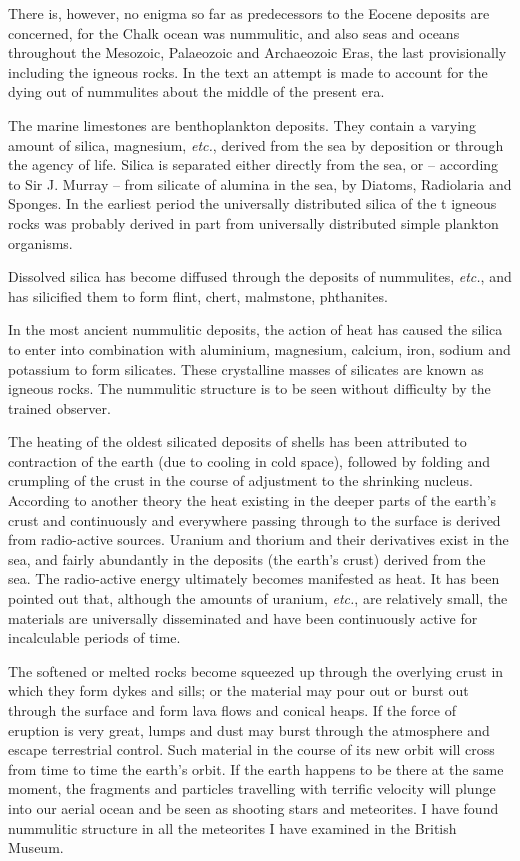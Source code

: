 \documentclass[a4paper, 12pt, oneside]{article}
\begin{document}
There is, however, no enigma so far as predecessors to the Eocene deposits are concerned, for the Chalk ocean was nummulitic, and also seas and oceans throughout the Mesozoic, Palaeozoic and Archaeozoic Eras, the last provisionally including the igneous rocks. In the text an attempt is made to account for the dying out of nummulites about the middle of the present era.

The marine limestones are benthoplankton deposits. They contain a varying amount of silica, magnesium, \emph{etc.}, derived from the sea by deposition or through the agency of life. Silica is separated either directly from the sea, or -- according to Sir J. Murray -- from silicate of alumina in the sea, by Diatoms, Radiolaria and Sponges. In the earliest period the universally distributed silica of the t igneous rocks was probably derived in part from universally distributed simple plankton organisms.

Dissolved silica has become diffused through the deposits of nummulites, \emph{etc.}, and has silicified them to form flint, chert, malmstone, phthanites.

In the most ancient nummulitic deposits, the action of heat has caused the silica to enter into combination with aluminium, magnesium, calcium, iron, sodium and potassium to form silicates. These crystalline masses of silicates are known as igneous rocks. The nummulitic structure is to be seen without difficulty by the trained observer.

The heating of the oldest silicated deposits of shells has been attributed to contraction of the earth (due to cooling in cold space), followed by folding and crumpling of the crust in the course of adjustment to the shrinking nucleus. According to another theory the heat existing in the deeper parts of the earth's crust and continuously and everywhere passing through to the surface is derived from radio-active sources. Uranium and thorium and their derivatives exist in the sea, and fairly abundantly in the deposits (the earth's crust) derived from the sea. The radio-active energy ultimately becomes manifested as heat. It has been pointed out that, although the amounts of uranium, \emph{etc.}, are relatively small, the materials are universally disseminated and have been continuously active for incalculable periods of time.

The softened or melted rocks become squeezed up through the overlying crust in which they form dykes and sills; or the material may pour out or burst out through the surface and form lava flows and conical heaps. If the force of eruption is very great, lumps and dust may burst through the atmosphere and escape terrestrial control. Such material in the course of its new orbit will cross from time to time the earth's orbit. If the earth happens to be there at the same moment, the fragments and particles travelling with terrific velocity will plunge into our aerial ocean and be seen as shooting stars and meteorites. I have found nummulitic structure in all the meteorites I have examined in the British Museum.
\end{document}
